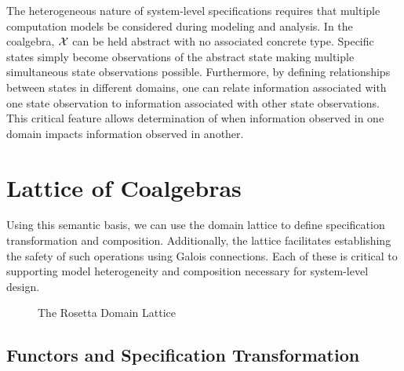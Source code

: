\documentclass[12pt]{article}
\begin{document}
The heterogeneous nature of system-level specifications requires that multiple computation
models be considered during modeling and analysis.  In the coalgebra, $\mathcal X$ can be
held abstract with no associated concrete type.  Specific states simply become
observations of the abstract state making multiple simultaneous state observations
possible.  Furthermore, by defining relationships between states in different domains, one
can relate information associated with one state observation to information associated
with other state observations.  This critical feature allows determination of when
information observed in one domain impacts information observed in another.

\section{Lattice of Coalgebras}

Using this semantic basis, we can use the domain lattice to define specification
transformation and composition.  Additionally, the lattice facilitates establishing the
safety of such operations using Galois connections.  Each of these is critical to
supporting model heterogeneity and composition necessary for system-level design.



\begin{figure}[hbtp]
  \caption{The Rosetta Domain Lattice}
  \label{fig:semi-lattice-detailed}
\end{figure}

\subsection{Functors and Specification Transformation}
\end{document}
